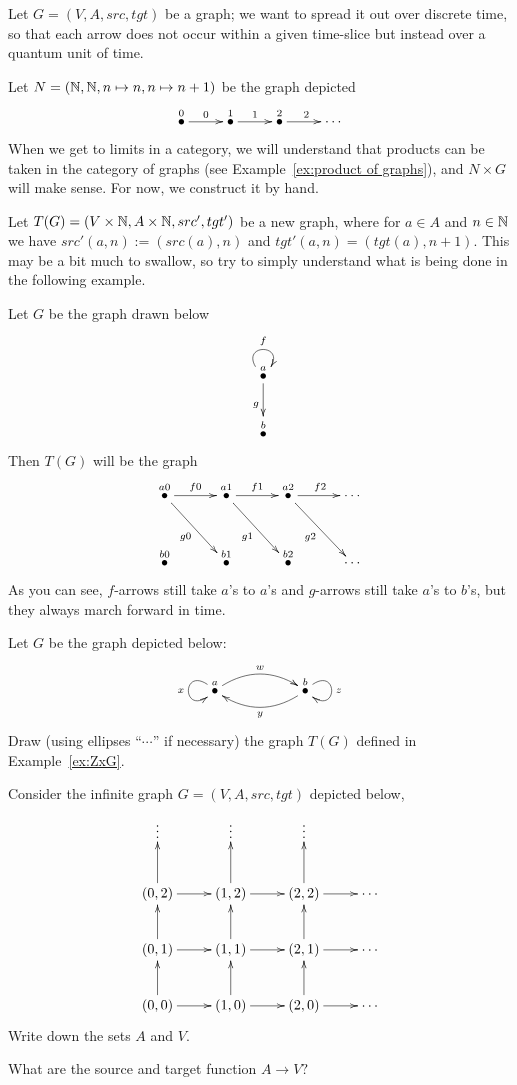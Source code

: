 \documentclass[../main/CT4S-EN-RU]{subfiles}
\begin{document}
\begin{exampleENG}\label{ex:ZxG}
Let $G=(V,A,src,tgt)$ be a graph; we want to spread it out over discrete time, so that each arrow does not occur within a given time-slice but instead over a quantum unit of time. 

Let $N=({\mathbb N},{\mathbb N},n\mapsto n,n\mapsto n+1)$ be the graph depicted 
$$\xymatrix{\LMO{0}\ar[r]^0&\LMO{1}\ar[r]^1&\LMO{2}\ar[r]^2&\cdots}$$
When we get to limits in a category, we will understand that products can be taken in the category of graphs (see  Example~\ref{ex:product of graphs}), and $N\times G$ will make sense. For now, we construct it by hand.

Let $T(G)=(V\times {\mathbb N},A\times{\mathbb N},src',tgt')$ be a new graph, where for $a\in A$ and $n\in{\mathbb N}$ we have $src'(a,n):=(src(a),n)$ and $tgt'(a,n)=(tgt(a),n+1).$ This may be a bit much to swallow, so try to simply understand what is being done in the following example. 

Let $G$ be the graph drawn below 
$$\xymatrix{\LMO{a}\ar@(ul,ur)[]^f\ar[d]_g\\\LMO{b}}$$
Then $T(G)$ will be the graph 
$$\xymatrix@=30pt{
\LMO{a0}\ar[r]^{f0}\ar[rd]_{g0}&\LMO{a1}\ar[r]^{f1}\ar[rd]_{g1}&\LMO{a2}\ar[r]^{f2}\ar[rd]_{g2}&\cdots\\
\LMO{b0}&\LMO{b1}&\LMO{b2}&\cdots
}
$$
As you can see, $f$-arrows still take $a$'s to $a$'s and $g$-arrows still take $a$'s to $b$'s, but they always march forward in time.
\end{exampleENG}

\begin{exampleRUS}\label{ex:ZxG}
\end{exampleRUS}

\begin{exerciseENG}\label{exc:secret turing}
Let $G$ be the graph depicted below:
$$
\xymatrix{\LMO{a}\ar@/^1pc/[rr]^w\ar@(lu,ld)[]_x&&\LMO{b}\ar@/^1pc/[ll]^y\ar@(ur,dr)[]^z}
$$
Draw (using ellipses “$\cdots$” if necessary) the graph $T(G)$ defined in Example~\ref{ex:ZxG}.
\end{exerciseENG}

\begin{exerciseRUS}\label{exc:secret turing}
\end{exerciseRUS}

\begin{exerciseENG}\label{exc:lattice}
Consider the infinite graph $G=(V,A,src,tgt)$ depicted below,
$$
\xymatrix{
\vdots&\vdots&\vdots\\
(0,2)\ar[r]\ar[u]&(1,2)\ar[r]\ar[u]&(2,2)\ar[r]\ar[u]&\cdots\\
(0,1)\ar[r]\ar[u]&(1,1)\ar[r]\ar[u]&(2,1)\ar[r]\ar[u]&\cdots\\
(0,0)\ar[r]\ar[u]&(1,0)\ar[r]\ar[u]&(2,0)\ar[r]\ar[u]&\cdots}
$$
\sexc Write down the sets $A$ and $V.$ 
\item What are the source and target function $A\to V?$  
\endsexc
\end{exerciseENG}
\end{document}
